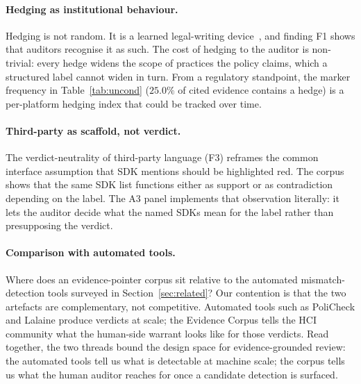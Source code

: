 \documentclass[11pt,a4paper]{article}
\begin{document}
\paragraph{Hedging as institutional behaviour.}
Hedging is not random. It is a learned legal-writing
device~\citep{bhatia2016theory,fabian2017large}, and finding F1 shows
that auditors recognise it as such. The cost of hedging to the
auditor is non-trivial: every hedge widens the scope of practices the
policy claims, which a structured label cannot widen in turn. From a
regulatory standpoint, the marker frequency in Table~\ref{tab:uncond}
($25.0\%$ of cited evidence contains a hedge) is a per-platform
hedging index that could be tracked over time.

\paragraph{Third-party as scaffold, not verdict.}
The verdict-neutrality of third-party language (F3) reframes the
common interface assumption that SDK mentions should be highlighted
red. The corpus shows that the same SDK list functions either as
support or as contradiction depending on the label. The
A3 panel implements that observation literally: it lets the auditor
decide what the named SDKs mean for the label rather than presupposing
the verdict.

\paragraph{Comparison with automated tools.}
Where does an evidence-pointer corpus sit relative to the automated
mismatch-detection tools surveyed in Section~\ref{sec:related}? Our
contention is that the two artefacts are complementary, not
competitive. Automated tools such as PoliCheck
\citep{andow2020policheck} and Lalaine \citep{xiao2023lalaine}
produce verdicts at scale; the Evidence Corpus tells the HCI community
what the human-side warrant looks like for those verdicts. Read
together, the two threads bound the design space for
evidence-grounded review: the automated tools tell us what is
detectable at machine scale; the corpus tells us what the human
auditor reaches for once a candidate detection is surfaced.
\end{document}
